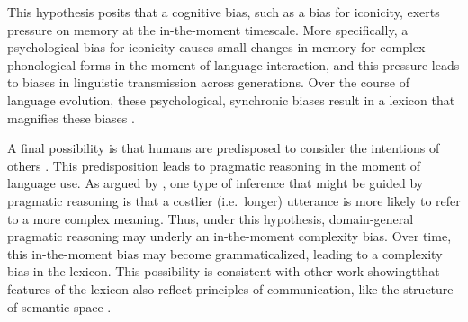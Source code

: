 
\hspace*{.3 cm}{ \it 3.\ The Memory Hypothesis.} This hypothesis posits that a cognitive bias, such as a bias for iconicity, exerts pressure on memory at the in-the-moment timescale. More specifically, a psychological bias for iconicity causes small changes in memory for complex phonological forms in the moment of language interaction, and  this  pressure leads to biases in linguistic transmission across generations. Over the course of language evolution, these psychological, synchronic biases result in a lexicon that magnifies these biases  \cite{griffiths2007language}. 


\hspace*{.3 cm}{ \it 4.\ The Pragmatic Hypothesis. } A final possibility is that humans are predisposed to consider the intentions of others \cite{tomasello2005understanding}. This predisposition leads to pragmatic reasoning in the moment of language use. As argued by , one type of inference that might be guided by pragmatic reasoning is that a costlier (i.e.\ longer) utterance is more likely to refer to a more complex meaning. Thus, under this hypothesis, domain-general pragmatic reasoning may underly an in-the-moment complexity bias. Over time, this in-the-moment bias may become grammaticalized, leading to a complexity bias in the lexicon. This possibility is consistent with other work showingtthat features of the lexicon also reflect principles of communication, like the structure of semantic space \cite{regier2007color,kemp2012kinship,piantadosi2012communicative}. 




